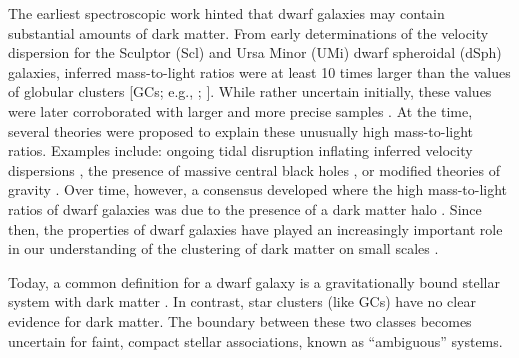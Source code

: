 The earliest spectroscopic work hinted that dwarf galaxies may contain
substantial amounts of dark matter. From early determinations of the
velocity dispersion for the Sculptor (Scl) and Ursa Minor (UMi) dwarf
spheroidal (dSph) galaxies, inferred mass-to-light ratios were at least
10 times larger than the values of globular clusters {[}GCs; e.g.,
\citet{aaronson1983}; \citet{aaronson+olszewski1987}{]}. While rather
uncertain initially, these values were later corroborated with larger
and more precise samples \citep[e.g.,][]{hargreaves+1994}. At the time,
several theories were proposed to explain these unusually high
mass-to-light ratios. Examples include: ongoing tidal disruption
inflating inferred velocity dispersions
\citep[e.g.,][]{kuhn+miller1989}, the presence of massive central black
holes \citep[e.g.,][]{strobel+lake1994}, or modified theories of gravity
\citep{milgrom1995}. Over time, however, a consensus developed where the
high mass-to-light ratios of dwarf galaxies was due to the presence of a
dark matter halo \citep[e.g.,][]{dekel+silk1986, wechsler+tinker2018}.
Since then, the properties of dwarf galaxies have played an increasingly
important role in our understanding of the clustering of dark matter on
small scales \citep[e.g.,][]{sales+2022, bullock+boylan-kolchin2017}.

Today, a common definition for a dwarf galaxy is a gravitationally bound
stellar system with dark matter \citep[or, more specifically, not
consistent with Newtonian dynamics of visible matter
alone,][]{willman+strader2012}. In contrast, star clusters (like GCs)
have no clear evidence for dark matter. The boundary between these two
classes becomes uncertain for faint, compact stellar associations, known
as ``ambiguous'' systems.


